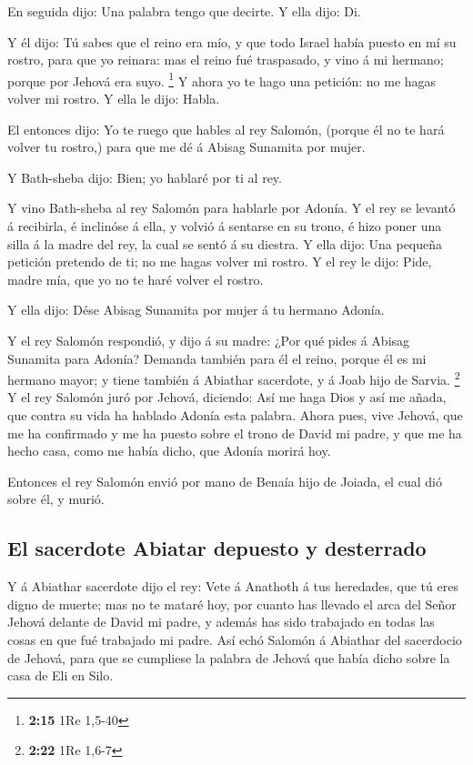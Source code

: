  En seguida dijo: Una palabra tengo que decirte. Y ella
dijo: Di.

 Y él dijo: Tú sabes que el reino era mío, y que todo
Israel había puesto en mí su rostro, para que yo reinara: mas el reino
fué traspasado, y vino á mi hermano; porque por Jehová era suyo.
\footnote{\textbf{2:15} 1Re 1,5-40}  Y ahora yo te hago
una petición: no me hagas volver mi rostro. Y ella le dijo: Habla.

 El entonces dijo: Yo te ruego que hables al rey Salomón,
(porque él no te hará volver tu rostro,) para que me dé á Abisag
Sunamita por mujer.

 Y Bath-sheba dijo: Bien; yo hablaré por ti al rey.

 Y vino Bath-sheba al rey Salomón para hablarle por
Adonía. Y el rey se levantó á recibirla, é inclinóse á ella, y volvió á
sentarse en su trono, é hizo poner una silla á la madre del rey, la cual
se sentó á su diestra.  Y ella dijo: Una pequeña petición
pretendo de ti; no me hagas volver mi rostro. Y el rey le dijo: Pide,
madre mía, que yo no te haré volver el rostro.

 Y ella dijo: Dése Abisag Sunamita por mujer á tu hermano
Adonía.

 Y el rey Salomón respondió, y dijo á su madre: ¿Por qué
pides á Abisag Sunamita para Adonía? Demanda también para él el reino,
porque él es mi hermano mayor; y tiene también á Abiathar sacerdote, y á
Joab hijo de Sarvia. \footnote{\textbf{2:22} 1Re 1,6-7} 
Y el rey Salomón juró por Jehová, diciendo: Así me haga Dios y así me
añada, que contra su vida ha hablado Adonía esta palabra.
 Ahora pues, vive Jehová, que me ha confirmado y me ha
puesto sobre el trono de David mi padre, y que me ha hecho casa, como me
había dicho, que Adonía morirá hoy.

 Entonces el rey Salomón envió por mano de Benaía hijo de
Joiada, el cual dió sobre él, y murió.

\hypertarget{el-sacerdote-abiatar-depuesto-y-desterrado}{%
\subsection{El sacerdote Abiatar depuesto y
desterrado}\label{el-sacerdote-abiatar-depuesto-y-desterrado}}

 Y á Abiathar sacerdote dijo el rey: Vete á Anathoth á
tus heredades, que tú eres digno de muerte; mas no te mataré hoy, por
cuanto has llevado el arca del Señor Jehová delante de David mi padre, y
además has sido trabajado en todas las cosas en que fué trabajado mi
padre.  Así echó Salomón á Abiathar del sacerdocio de
Jehová, para que se cumpliese la palabra de Jehová que había dicho sobre
la casa de Eli en Silo.

